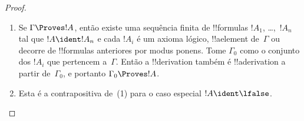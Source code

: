 \documentclass[../../../include/open-logic-section]{subfiles}
\begin{document}
\begin{proof}
  \begin{enumerate}
    \item Se $\Gamma \Proves !A$, então existe uma sequência finita de
      !!{formula}s $!A_1$, \dots,~$!A_n$ tal que $!A \ident !A_n$ e
      cada $!A_i$ é um axioma lógico, !!a{element} de~$\Gamma$ ou
      decorre de !!{formula}s anteriores por modus ponens. Tome
      $\Gamma_0$ como o conjunto dos $!A_i$ que pertencem a~$\Gamma$.
      Então a !!{derivation} também é !!a{derivation} a partir
      de~$\Gamma_0$, e portanto $\Gamma_0 \Proves !A$.
    \item Esta é a contrapositiva de~(1) para o caso especial $!A
      \ident \lfalse$.
\end{enumerate}
\end{proof}
\end{document}
